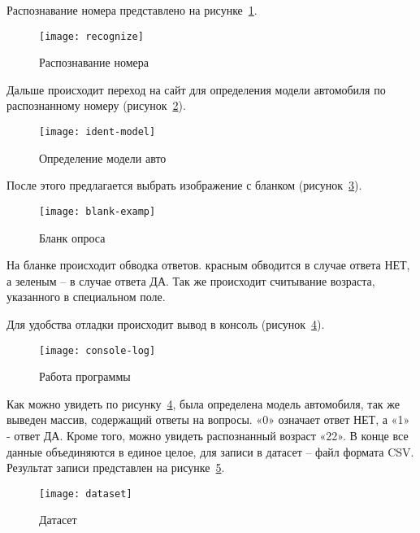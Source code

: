 Распознавание номера представлено на рисунке~\ref{f:recognize}.

\begin{figure}[h!]
	\centering
	\texttt{[image: recognize]}
	\caption{Распознавание номера}
	\label{f:recognize}
\end{figure}


\newpage

Дальше происходит переход на сайт для определения модели автомобиля по распознанному номеру (рисунок~\ref{f:ident-model}).

\begin{figure}[h!]
	\centering
    \vspace{\toppaddingoffigure}
	\texttt{[image: ident-model]}
	\caption{Определение модели авто}
	\label{f:ident-model}
\end{figure}


После этого предлагается выбрать изображение с бланком (рисунок~\ref{f:blank-examp}).

\begin{figure}[h!]
	\centering
	\texttt{[image: blank-examp]}
	\caption{Бланк опроса}
	\label{f:blank-examp}
\end{figure}


На бланке происходит обводка ответов. красным обводится в случае ответа НЕТ, а зеленым – в случае ответа ДА. Так же происходит считывание возраста, указанного в специальном поле.

Для удобства отладки происходит вывод в консоль (рисунок~\ref{f:console-log}).

\begin{figure}[h]
	\centering
	\texttt{[image: console-log]}
	\caption{Работа программы}
	\label{f:console-log}
\end{figure}

\newpage
Как можно увидеть по рисунку~\ref{f:console-log}, была определена модель автомобиля, так же выведен массив, содержащий ответы на вопросы. «0» означает ответ НЕТ, а «1» - ответ ДА. Кроме того, можно увидеть распознанный возраст «22». В конце все данные объединяются в единое целое, для записи в датасет – файл формата CSV. Результат записи представлен на рисунке~\ref{f:dataset}.

\begin{figure}[h!]
	\centering
    \vspace{\toppaddingoffigure}
	\texttt{[image: dataset]}
	\caption{Датасет}
	\label{f:dataset}
\end{figure}


